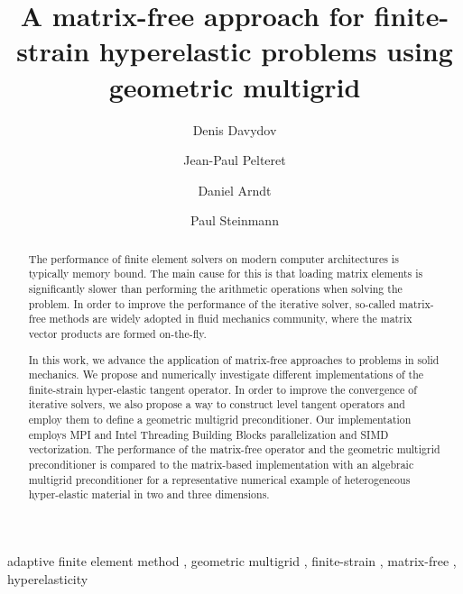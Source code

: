 \documentclass[preprint,12pt,times]{elsarticle}
\begin{document}
\begin{frontmatter}
  \title{
  A matrix-free approach for finite-strain hyperelastic problems using geometric multigrid
  }

  \author[a]{Denis Davydov}

  \author[a]{Jean-Paul Pelteret}

  \author[b]{Daniel Arndt}

  \author[a]{Paul Steinmann}


  \address[a]{Chair of Applied Mechanics,
  Friedrich-Alexander-Universit\"{a}t Erlangen-N\"{u}rnberg,
  Egerlandstr.\ 5, 91058 Erlangen, Germany}

  \address[b]{Interdisciplinary Center for Scientific Computing (IWR),
      Heidelberg University,
      Im Neuenheimer Feld 205,
      69120 Heidelberg,
      Germany}


  \begin{abstract}
    The performance of finite element solvers on modern computer architectures is typically memory bound.
    The main cause for this is that loading matrix elements is significantly slower than performing the arithmetic operations when solving the problem.
    In order to improve the performance of the iterative solver, so-called matrix-free methods are
    widely adopted in fluid mechanics community, where the matrix vector products are formed on-the-fly.

    In this work, we advance the application of matrix-free approaches to problems in solid mechanics.
    We propose and numerically investigate different implementations of the finite-strain hyper-elastic tangent operator.
    In order to improve the convergence of iterative solvers, we also propose a way to construct level tangent operators
    and employ them to define a geometric multigrid preconditioner.
    Our implementation employs MPI and Intel Threading Building Blocks parallelization and SIMD vectorization.
    The performance of the matrix-free operator and the geometric multigrid preconditioner is compared to the matrix-based implementation with an algebraic multigrid preconditioner for a representative numerical example of heterogeneous hyper-elastic material in two and three dimensions.
  \end{abstract}


  \begin{keyword}
      adaptive finite element method \sep
      geometric multigrid \sep
      finite-strain \sep
      matrix-free \sep
      hyperelasticity
  \end{keyword}

  \end{frontmatter}
\end{document}
